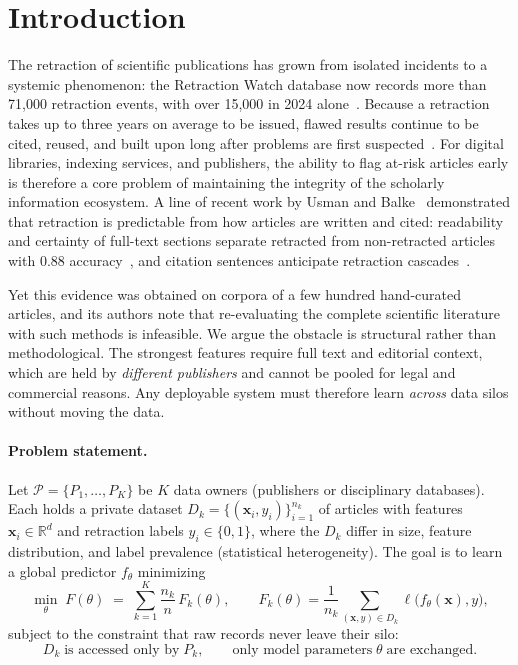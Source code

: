 \documentclass[review,12pt]{elsarticle}
\begin{document}
\section{Introduction}
\label{sec:intro}
The retraction of scientific publications has grown from isolated incidents to
a systemic phenomenon: the Retraction Watch database now records more than
71{,}000 retraction events, with over 15{,}000 in 2024
alone~\cite{ref_rw,ref_vannoorden}. Because a retraction takes up to three
years on average to be issued, flawed results continue to be cited, reused,
and built upon long after problems are first suspected~\cite{ref_usman_tpdl23}.
For digital libraries, indexing services, and publishers, the ability to flag
at-risk articles early is therefore a core problem of maintaining the integrity
of the scholarly information ecosystem. A line of recent work by Usman and
Balke~\cite{ref_usman_tpdl23,ref_usman_tpdl24,ref_usman_dasfaa25,ref_usman_websci25}
demonstrated that retraction is predictable from how articles are written and
cited: readability and certainty of full-text sections separate retracted from
non-retracted articles with 0.88 accuracy~\cite{ref_usman_websci25}, and
citation sentences anticipate retraction cascades~\cite{ref_usman_tpdl24}.

Yet this evidence was obtained on corpora of a few hundred hand-curated
articles, and its authors note that re-evaluating the complete scientific
literature with such methods is infeasible. We argue the obstacle is
structural rather than methodological. The strongest features require full
text and editorial context, which are held by \emph{different publishers} and
cannot be pooled for legal and commercial reasons. Any deployable system must
therefore learn \emph{across} data silos without moving the data.

\paragraph{Problem statement.}
Let $\mathcal{P} = \{P_1,\dots,P_K\}$ be $K$ data owners (publishers or
disciplinary databases). Each holds a private dataset
$D_k = \{(\mathbf{x}_i, y_i)\}_{i=1}^{n_k}$ of articles with features
$\mathbf{x}_i \in \mathbb{R}^d$ and retraction labels $y_i \in \{0,1\}$,
where the $D_k$ differ in size, feature distribution, and label prevalence
(statistical heterogeneity). The goal is to learn a global predictor
$f_\theta$ minimizing
\begin{equation}
\min_\theta \; F(\theta) \;=\; \sum_{k=1}^{K} \frac{n_k}{n}\, F_k(\theta),
\qquad
F_k(\theta) = \frac{1}{n_k} \sum_{(\mathbf{x},y)\in D_k}
\ell\bigl(f_\theta(\mathbf{x}),y\bigr),
\label{eq:objective}
\end{equation}
subject to the constraint that raw records never leave their silo:
\begin{equation}
D_k \;\text{is accessed only by}\; P_k, \qquad
\text{only model parameters}\;\theta\;\text{are exchanged}.
\label{eq:constraint}
\end{equation}
\end{document}
